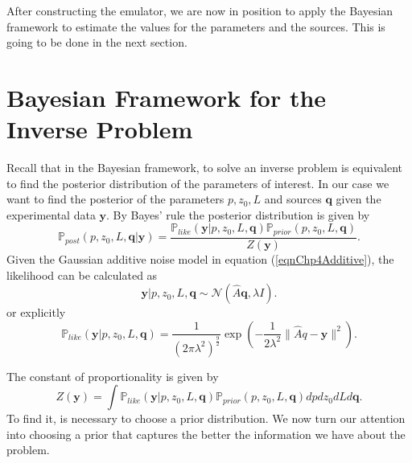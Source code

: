 \documentclass[12pt]{book}
\newcommand{\post}{\mathbb{P}_{post}}
\newcommand{\like}{\mathbb{P}_{like}}
\newcommand{\prior}{\mathbb{P}_{prior}}
\newcommand{\q}{\textbf{q}}
\newcommand{\pars}{p,z_{0},L}
\newcommand{\y}{\textbf{y}}
\begin{document}
After constructing the emulator, we are now in position to apply
the Bayesian framework to estimate the values for the parameters and the sources. 
This is going to be done in the next section.

\section{Bayesian Framework for the Inverse Problem}

Recall that in the Bayesian framework, to solve an inverse problem
is equivalent to find the posterior distribution of the parameters
of interest. In our case we want to find the posterior
of the parameters $\pars$ and sources $\q$ given
the experimental data $\y$. By Bayes' rule the posterior
distribution is given by
\begin{equation}\label{eqnBayesChp4}
\post(p,z_{0},L,\q|\y)=\frac{\like(\y|p,z_{0},L,\q)\prior(p,z_{0},L,\q)}{Z(\y)}.
\end{equation}
Given the Gaussian additive noise model in equation (\ref{eqnChp4Additive}), 
the likelihood can be calculated as
\begin{equation*}
\y|\pars,\q\sim\mathcal{N}(\widehat{A}\q,\lambda I).
\end{equation*}
or explicitly
\begin{equation}\label{eqnFinalLike}
\like(\y|\pars,\q)=\frac{1}{(2\pi\lambda^{2})^{\frac{9}{2}}}\exp\left(-\frac{1}{2\lambda^{2}}\|\widehat{A}q-\y\|^{2}\right).
\end{equation}




The constant of proportionality is given by
\begin{equation}\label{eqnPropConst}
Z(\y)=\int\like(\y|p,z_{0},L,\q)\prior(p,z_{0},L,\q)dpdz_{0}dLd\q.
\end{equation}
To find it, is necessary to choose a prior distribution. We now
turn our attention into choosing a prior that captures the better the information
we have about the problem.
\end{document}
